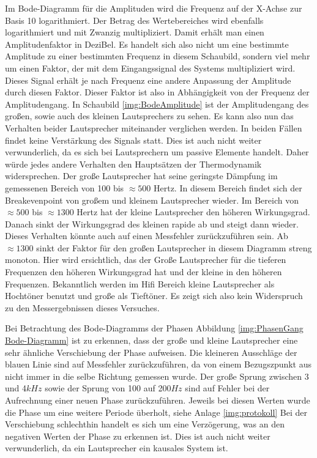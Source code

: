 Im Bode-Diagramm für die Amplituden wird die Frequenz auf der X-Achse zur Basis 10 logarithmiert. Der Betrag des Wertebereiches wird ebenfalls logarithmiert und mit Zwanzig multipliziert. Damit erhält man einen Amplitudenfaktor in DeziBel. Es handelt sich also nicht um eine bestimmte Amplitude zu einer bestimmten Frequenz in diesem Schaubild, sondern viel mehr um einen Faktor, der mit dem Eingangssignal des Systems multipliziert wird. Dieses Signal erhält je nach Frequenz eine andere Anpassung der Amplitude durch diesen Faktor. Dieser Faktor ist also in Abhängigkeit von der Frequenz der Amplitudengang.
In Schaubild \ref{img:BodeAmplitude} ist der Amplitudengang des großen, sowie auch des kleinen Lautsprechers zu sehen.
Es kann also nun das Verhalten beider Lautsprecher miteinander verglichen werden. In beiden Fällen findet keine Verstärkung des Signals statt. Dies ist auch nicht weiter verwunderlich, da es sich bei Lautsprechern um passive Elemente handelt. Daher würde jedes andere Verhalten den Hauptsätzen der Thermodynamik widersprechen.
Der große Lautsprecher hat seine geringste Dämpfung im gemessenen Bereich von 100 bis $\approx500$ Hertz. In diesem Bereich findet sich der Breakevenpoint von großem und kleinem Lautsprecher wieder. Im Bereich von $\approx500$ bis $\approx1300$ Hertz hat der kleine Lautsprecher den höheren Wirkungsgrad. Danach sinkt der Wirkungsgrad des kleinen rapide ab und steigt dann wieder. Dieses Verhalten könnte auch auf einen Messfehler zurückzuführen sein. Ab $\approx1300$ sinkt der Faktor für den großen Lautsprecher in diesem Diagramm streng monoton. Hier wird ersichtlich, das der Große Lautsprecher für die tieferen Frequenzen den höheren Wirkungsgrad hat und der kleine in den höheren Frequenzen. Bekanntlich werden im Hifi Bereich kleine Lautsprecher als Hochtöner benutzt und große  als Tieftöner. Es zeigt sich also kein Widerspruch zu den Messergebnissen dieses Versuches.

Bei Betrachtung des Bode-Diagramms der Phasen Abbildung \ref{img:PhasenGang Bode-Diagramm} ist zu erkennen, dass der große und kleine Lautsprecher eine sehr ähnliche Verschiebung der Phase aufweisen.
Die kleineren Ausschläge der blauen Linie sind auf Messfehler zurückzuführen, da von einem Bezugszpunkt aus nicht immer in die selbe Richtung gemessen wurde. Der große Sprung zwischen 3 und 4$kHz$ sowie der Sprung von 100 auf 200$Hz$ sind auf Fehler bei der Aufrechnung einer neuen Phase zurückzuführen. Jeweils bei diesen Werten wurde die Phase um eine weitere Periode überholt, siehe Anlage \ref{img:protokoll} Bei der Verschiebung schlechthin handelt es sich um eine Verzögerung, was an den negativen Werten der Phase zu erkennen ist. Dies ist auch nicht weiter verwunderlich, da ein Lautsprecher ein kausales System ist.


